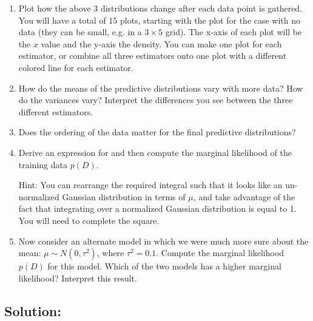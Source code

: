 \documentclass[submit]{harvardml}
\begin{document}
\begin{problem}
\begin{enumerate}
   
\item Plot how the above 3 distributions change after each data point
  is gathered.  You will have a total of 15 plots, starting with the
  plot for the case with no data (they can be small, e.g. in a $3\times5$
  grid).  The x-axis of each plot will be the $x$ value and the y-axis
  the density.  You can make one plot for each estimator, or combine
  all three estimators onto one plot with a different colored line for
  each estimator.
  
    
\item How do the means of the predictive distributions vary with more
  data?  How do the variances vary?  Interpret the differences you see
  between the three different estimators.
  
  \item Does the ordering of the data matter for the final predictive
  distributions?  

  \item Derive an expression for and then compute the marginal
    likelihood of the training data $p(D)$.

    Hint: You can rearrange the required integral such that it looks like an un-normalized
    Gaussian distribution in terms of $\mu$,  and take advantage of the fact that
    integrating over a normalized Gaussian distribution is equal to 1.
    You will need to complete the square.
    
  \item Now consider an alternate model in which we were much more sure
  about the mean: $\mu \sim N(0,\tau^2)$, where $\tau^2 = 0.1$.
  Compute the marginal likelihood $p(D)$ for this model.  Which of the
  two models has a higher marginal likelihood? Interpret this result.

\end{enumerate}

\end{problem}

\subsection*{Solution:}
\end{document}
